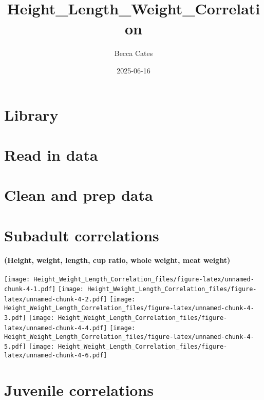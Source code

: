 \documentclass[
]{article}
\title{Height\_Length\_Weight\_Correlation}
\author{Becca Cates}
\date{2025-06-16}
\begin{document}
\maketitle

\hypertarget{library}{%
\section{Library}\label{library}}

\hypertarget{read-in-data}{%
\section{Read in data}\label{read-in-data}}

\hypertarget{clean-and-prep-data}{%
\section{Clean and prep data}\label{clean-and-prep-data}}

\hypertarget{subadult-correlations}{%
\section{Subadult correlations}\label{subadult-correlations}}

\hypertarget{height-weight-length-cup-ratio-whole-weight-meat-weight}{%
\paragraph{\texorpdfstring{\textbf{(Height, weight, length, cup ratio,
whole weight, meat
weight)}}{(Height, weight, length, cup ratio, whole weight, meat weight)}}\label{height-weight-length-cup-ratio-whole-weight-meat-weight}}

\texttt{[image: Height\_Weight\_Length\_Correlation\_files/figure-latex/unnamed-chunk-4-1.pdf]}
\texttt{[image: Height\_Weight\_Length\_Correlation\_files/figure-latex/unnamed-chunk-4-2.pdf]}
\texttt{[image: Height\_Weight\_Length\_Correlation\_files/figure-latex/unnamed-chunk-4-3.pdf]}
\texttt{[image: Height\_Weight\_Length\_Correlation\_files/figure-latex/unnamed-chunk-4-4.pdf]}
\texttt{[image: Height\_Weight\_Length\_Correlation\_files/figure-latex/unnamed-chunk-4-5.pdf]}
\texttt{[image: Height\_Weight\_Length\_Correlation\_files/figure-latex/unnamed-chunk-4-6.pdf]}

\hypertarget{juvenile-correlations}{%
\section{Juvenile correlations}\label{juvenile-correlations}}
\end{document}
